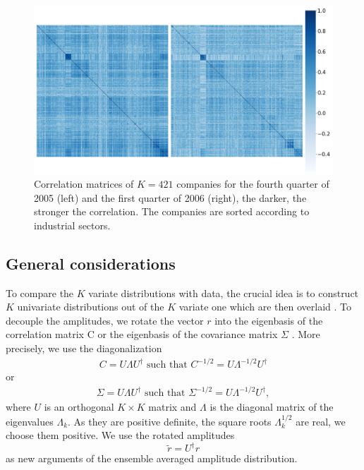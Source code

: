 \begin{figure}[htbp]
    \centering
    \includegraphics[width=\columnwidth]
    {figures/03_correlation_matrix.png}
    \caption{Correlation matrices of $K = 421$ companies for the fourth quarter
             of 2005 (left) and the first quarter of 2006 (right), the darker,
             the stronger the correlation. The companies are sorted according
             to industrial sectors.}
    \label{fig:correlation_matrices}
\end{figure}


\subsection{General considerations}\label{subsec:general_considerations}

To compare the $K$ variate distributions with data, the crucial idea is to
construct $K$ univariate distributions out of the $K$ variate one which are
then overlaid \cite{exact_distributions_guhr}. To decouple the amplitudes, we
rotate the vector $r$ into the eigenbasis of the correlation matrix C or the
eigenbasis of the covariance matrix $\Sigma$
\cite{non_stationarity_fin_guhr,exact_distributions_guhr}. More precisely, we
use the diagonalization
\begin{align}
    C = U \Lambda U^{\dagger} \text{ such that }
    C^{-1/2} = U \Lambda^{-1/2} U^{\dagger}
\end{align}
or
\begin{align}
    \Sigma = U \Lambda U^{\dagger} \text{ such that }
    \Sigma^{-1/2} = U \Lambda^{-1/2} U^{\dagger},
\end{align}
where $U$ is an orthogonal $K \times K$ matrix and $\Lambda$ is the diagonal
matrix of the eigenvalues $\Lambda_{k}$. As they are positive definite, the
square roots $\Lambda_{k}^{1/2}$ are real, we choose them positive. We use the
rotated amplitudes
\begin{equation}
    \tilde{r} = U^{\dagger} r
\end{equation}
as new arguments of the ensemble averaged amplitude distribution.

